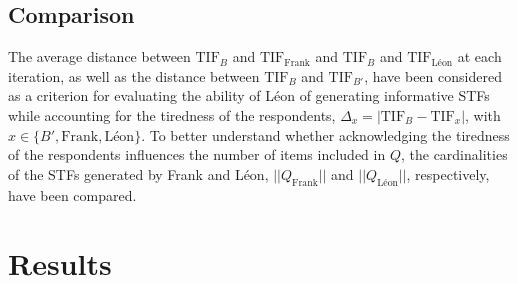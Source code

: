 \documentclass{svproc}
\begin{document}
\subsection{Comparison}

The average distance between $\text{TIF}_B$ and $\text{TIF}_{\text{Frank}}$ and $\text{TIF}_B$ and $\text{TIF}_{\text{Léon}}$ at each iteration, as well as the  distance between $\text{TIF}_B$ and $\text{TIF}_{B'}$, have been considered as a criterion for evaluating the ability of Léon of generating informative STFs while accounting for the tiredness of the respondents, $\Delta_x = |\text{TIF}_B - \text{TIF}_{x}|$, with $x \in \{B', \text{Frank}, \text{Léon}\}$.  
To better understand whether acknowledging the tiredness of the respondents influences the number of items included in $Q$, the cardinalities of the STFs generated by Frank and Léon, $||Q_{\text{Frank}}||$ and $||Q_{\text{Léon}}||$, respectively, have been compared. 

  

\section{Results}

%
\end{document}
